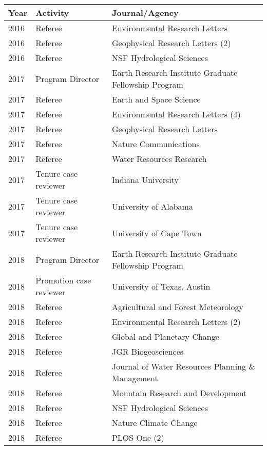 
\begin{longtable}{llp{12cm}}
Year & Activity & Journal/Agency\\
\hline 
\endhead 
2016 & Referee & Environmental Research Letters   \\
2016 & Referee & Geophysical Research Letters  (2) \\
2016 & Referee & NSF Hydrological Sciences   \\
2017 & Program Director & Earth Research Institute Graduate Fellowship Program   \\
2017 & Referee & Earth and Space Science   \\
2017 & Referee & Environmental Research Letters  (4) \\
2017 & Referee & Geophysical Research Letters   \\
2017 & Referee & Nature Communications   \\
2017 & Referee & Water Resources Research   \\
2017 & Tenure case reviewer & Indiana University   \\
2017 & Tenure case reviewer & University of Alabama   \\
2017 & Tenure case reviewer & University of Cape Town   \\
2018 & Program Director & Earth Research Institute Graduate Fellowship Program   \\
2018 & Promotion case reviewer & University of Texas, Austin   \\
2018 & Referee & Agricultural and Forest Meteorology   \\
2018 & Referee & Environmental Research Letters  (2) \\
2018 & Referee & Global and Planetary Change   \\
2018 & Referee & JGR Biogeosciences   \\
2018 & Referee & Journal of Water Resources Planning \& Management   \\
2018 & Referee & Mountain Research and Development    \\
2018 & Referee & NSF Hydrological Sciences   \\
2018 & Referee & Nature Climate Change   \\
2018 & Referee & PLOS One  (2) \\
\end{longtable}

